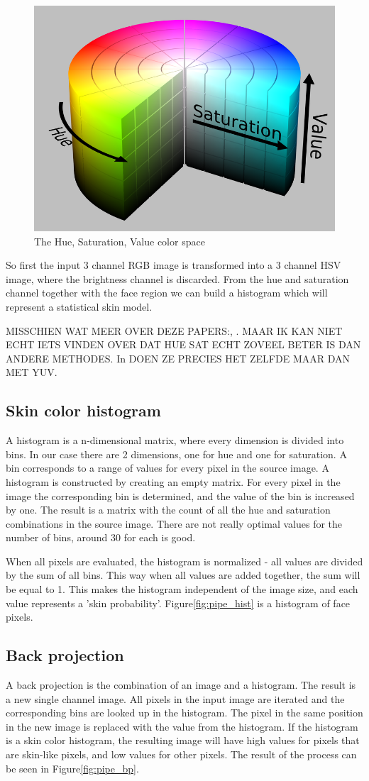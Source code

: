 \begin{figure}[htbp]
	\center
	\includegraphics[width=0.4\linewidth]{figures/hsv.png}
	\caption{The Hue, Saturation, Value color space}
	\label{fig:hsv}
\end{figure}

So first the input 3 channel RGB image is transformed into a 3 channel HSV image, where the brightness channel is discarded. From the hue and saturation channel together with the face region we can build a histogram which will represent a statistical skin model.


MISSCHIEN WAT MEER OVER DEZE PAPERS:\cite{Bradski98computervision}, \cite{Cooper07largelexicon}. MAAR IK KAN NIET ECHT IETS VINDEN OVER DAT HUE SAT ECHT ZOVEEL BETER IS DAN ANDERE METHODES. In \cite{Stenger06template-basedhand} DOEN ZE PRECIES HET ZELFDE MAAR DAN MET YUV.


\subsection*{Skin color histogram}
A histogram is a n-dimensional matrix, where every dimension is divided into bins. In our case there are 2 dimensions, one for hue and one for saturation. A bin corresponds to a range of values for every pixel in the source image. A histogram is constructed by creating an empty matrix. For every pixel in the image the corresponding bin is determined, and the value of the bin is increased by one. The result is a matrix with the count of all the hue and saturation combinations in the source image. There are not really optimal values for the number of bins, around 30 for each is good.

When all pixels are evaluated, the histogram is normalized - all values are divided by the sum of all bins. This way when all values are added together, the sum will be equal to 1. This makes the histogram independent of the image size, and each value represents a 'skin probability'. Figure\ref{fig:pipe_hist} is a histogram of face pixels.

\subsection*{Back projection}
A back projection is the combination of an image and a histogram. The result is a new single channel image. All pixels in the input image are iterated and the corresponding bins are looked up in the histogram. The pixel in the same position in the new image is replaced with the value from the histogram. If the histogram is a skin color histogram, the resulting image will have high values for pixels that are skin-like pixels, and low values for other pixels. The result of the process can be seen in Figure\ref{fig:pipe_bp}.


